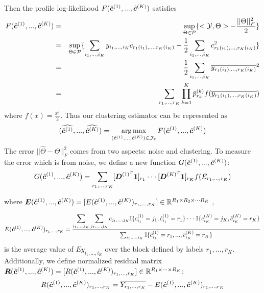 \documentclass{article}
\begin{document}
\begin{appendices}
Then the profile log-likelihood $F(\hat{\boldsymbol{c}}^{(1)},...,\hat{\boldsymbol{c}}^{(K)})$ satisfies
\begin{eqnarray*}
F(\hat{\boldsymbol{c}}^{(1)},...,\hat{\boldsymbol{c}}^{(K)}) &=& \displaystyle\sup_{\Theta\in\mathcal{P}}\{<\mathcal{Y},\Theta>-\frac{||\Theta||_F^2}{2}\}\\
&=& \displaystyle\sup_{\Theta\in\mathcal{P}}\{\displaystyle\sum_{i_1,...,i_K}y_{i_1,...,i_K}c_{r_1(i_1),...,r_K(i_K)}-\frac{1}{2}\sum_{i_1,...,i_K}c_{r_1(i_1),...,r_K(i_K)}^2\}\\
&=&\frac{1}{2}\sum_{i_1,...,i_K}\overline{y_{r_1(i_1),...,r_K(i_K)}}^2\\
&=&\sum_{r_1,...,r_K}\prod_{k=1}^{K}\hat{p}^{(k)}_{r_k}f(\overline{y_{r_1(i_1),...,r_K(i_K)}})
\end{eqnarray*}
where $f(x)=\frac{x^2}{2}$. 
Thus our clustering estimator can be represented as 
\begin{equation}
    (\widehat{\hat{\boldsymbol{c}}^{(1)}},...,\widehat{\hat{\boldsymbol{c}}^{(K)}}) = \displaystyle\operatorname*{arg\,max}_{(\hat{\boldsymbol{c}}^{(1)},...,\hat{\boldsymbol{c}}^{(K)})\in \mathcal{J}_\tau}F(\hat{\boldsymbol{c}}^{(1)},...,\hat{\boldsymbol{c}}^{(K)})
\end{equation}
The error $||\hat{\Theta}-\Theta||^2_F$ comes from two aspects: noise and clustering. To measure the error which is from noise, we define a new function $G(\hat{\boldsymbol{c}}^{(1)},...,\hat{\boldsymbol{c}}^{(K)})$:
\begin{equation*}
G(\hat{\boldsymbol{c}}^{(1)},...,\hat{\boldsymbol{c}}^{(K)}) = \displaystyle\sum_{r_1,...,r_K}[\boldsymbol{D}^{(1)^T}\boldsymbol{1}]_{r_1}\cdot\cdot\cdot[\boldsymbol{D}^{(K)^T}\boldsymbol{1}]_{r_K}f(E_{r_1,...,r_K})
\end{equation*}

where $\bm{E}(\hat{\boldsymbol{c}}^{(1)},...,\hat{\boldsymbol{c}}^{(K)}) = [E(\hat{\boldsymbol{c}}^{(1)},...,\hat{\boldsymbol{c}}^{(K)})_{r_1,...,r_K}]\in \mathbb{R}^{R_1\times R_2\times\cdot\cdot\cdot R_K}$ ,

\begin{equation*}
    E(\hat{\boldsymbol{c}}^{(1)},...,\hat{\boldsymbol{c}}^{(K)})_{r_1,...,r_K} = \frac{\displaystyle\sum_{i_1,...,i_K}\sum_{j_1,...,j_K}c_{j_1,...,j_K}\mathbb{I}\{c_{i_1}^{(1)}=j_1,\hat{c}_{i_1}^{(1)}=r_1\}\cdot\cdot\cdot\mathbb{I}\{c_{i_K}^{(K)}=j_K,\hat{c}_{i_K}^{(K)}=r_K\}}{\sum_{i_1,...,i_K}\mathbb{I}\{\hat{c}_{i_1}^{(1)}=r_1,...,\hat{c}_{i_K}^{(K)}=r_K\}}
\end{equation*}
is the average value of $Ey_{i_1,...,i_K}$ over the block defined by labels $r_1,...,r_K$.
Additionally, we define normalized residual matrix $\boldsymbol{R}(\hat{\boldsymbol{c}}^{(1)},...,\hat{\boldsymbol{c}}^{(K)}) = [R(\hat{\boldsymbol{c}}^{(1)},...,\hat{\boldsymbol{c}}^{(K)})_{r_1,...,r_K}] \in \mathbb{R}^{R_1\times\cdots\times R_K}$:
\begin{equation*}
    R(\hat{\boldsymbol{c}}^{(1)},...,\hat{\boldsymbol{c}}^{(K)})_{r_1,...,r_K}=\overline{Y_{r_1,...,r_K}}-E(\hat{\boldsymbol{c}}^{(1)},...,\hat{\boldsymbol{c}}^{(K)})_{r_1,...,r_K}
\end{equation*}


\end{appendices}
\end{document}
